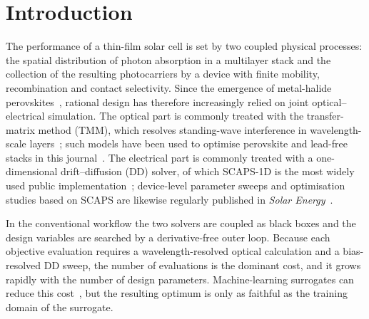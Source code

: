 \documentclass[preprint,12pt]{elsarticle}
\begin{document}
\section{Introduction}
\label{sec:intro}

The performance of a thin-film solar cell is set by two coupled physical
processes: the spatial distribution of photon absorption in a multilayer stack
and the collection of the resulting photocarriers by a device with finite
mobility, recombination and contact selectivity. Since the emergence of
metal-halide perovskites~\cite{green2014}, rational design has therefore
increasingly relied on joint optical--electrical simulation. The optical part
is commonly treated with the transfer-matrix method (TMM), which resolves
standing-wave interference in wavelength-scale layers~\cite{byrnes2016,
pettersson1999}; such models have been used to optimise perovskite and
lead-free stacks in this journal~\cite{sachchidanand2023, jangjoy2022}. The
electrical part is commonly treated with a one-dimensional drift--diffusion
(DD) solver, of which SCAPS-1D is the most widely used public
implementation~\cite{burgelman2000}; device-level parameter sweeps and
optimisation studies based on SCAPS are likewise regularly published in
\emph{Solar Energy}~\cite{pindolia2022, kaur2023}.

In the conventional workflow the two solvers are coupled as black boxes and
the design variables are searched by a derivative-free outer loop. Because
each objective evaluation requires a wavelength-resolved optical calculation
and a bias-resolved DD sweep, the number of evaluations is the dominant cost,
and it grows rapidly with the number of design parameters. Machine-learning
surrogates can reduce this cost~\cite{kaur2023}, but the resulting optimum is
only as faithful as the training domain of the surrogate.
\end{document}
